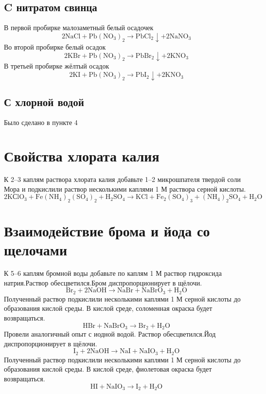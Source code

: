 \documentclass[a4paper,12pt]{article}
\begin{document}
\subsection{C нитратом свинца}
В первой пробирке малозаметный белый осадочек
\begin{equation} 
\mathrm{2NaCl + Pb(NO_3)_2  \longrightarrow PbCl_2\downarrow + 2NaNO_3 } 
\end{equation}
Во второй пробирке белый осадок
\begin{equation} 
\mathrm{2KBr + Pb(NO_3)_2  \longrightarrow PbBr_2\downarrow + 2KNO_3 } 
\end{equation}
В третьей пробирке жёлтый осадок
\begin{equation} 
\mathrm{2KI + Pb(NO_3)_2  \longrightarrow PbI_2\downarrow + 2KNO_3 } 
\end{equation}

\subsection{С хлорной водой}
Было сделано в пункте 4
\section{Свойства хлората калия}
К 2–3 каплям раствора хлората калия добавьте 1–2 микрошпателя твердой соли Мора и
подкислили раствор несколькими каплями 1 М раствора серной кислоты.
\begin{equation} 
\mathrm{2KСlO_3 + Fe(NH_4)_2(SO_4)_2 + H_2SO_4 \longrightarrow KCl + Fe_2(SO_4)_3 + (NH_4)_2SO_4 + H_2O } 
\end{equation}

\section{Взаимодействие брома и йода со щелочами}
К 5–6 каплям бромной воды добавьте по каплям 1 М раствор гидроксида натрия.Раствор обесцветился.Бром диспропорционирует в щёлочи. 
\begin{equation} 
\mathrm{Br_2 + 2NaOH \longrightarrow NaBr + NaBrO_3 + H_2O } 
\end{equation}
Полученный раствор подкислили несколькими каплями 1 М серной кислоты до образования
кислой среды. В кислой среде, соломенная окраска будет возвращаться.
\begin{equation} 
\mathrm{HBr + NaBrO_3 \longrightarrow Br_2 + H_2O } 
\end{equation} 
Провели аналогичный опыт с иодной водой. Раствор обесцветился.Йод диспропорционирует в щёлочи.
\begin{equation} 
\mathrm{I_2 + 2NaOH  \longrightarrow  NaI + NaIO_3 + H_2O } 
\end{equation} 
Полученный раствор подкислили несколькими каплями 1 М серной кислоты до образования
кислой среды. В кислой среде, фиолетовая окраска будет возвращаться.
\begin{equation} 
\mathrm{HI + NaIO_3 \longrightarrow I_2 + H_2O } 
\end{equation}
\end{document}
